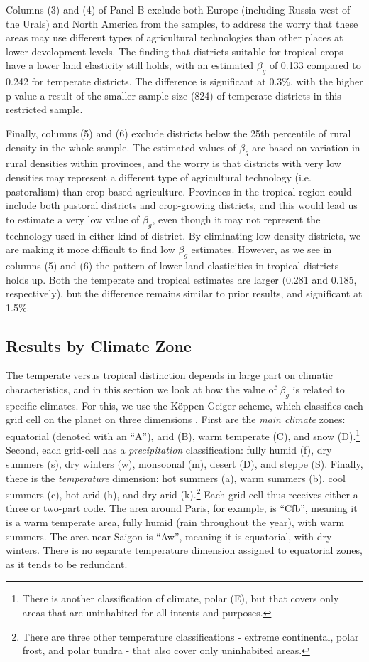 \documentclass[11pt]{article}
\begin{document}
Columns (3) and (4) of Panel B exclude both Europe (including Russia west of the Urals) and North America from the samples, to address the worry that these areas may use different types of agricultural technologies than other places at lower development levels. The finding that districts suitable for tropical crops have a lower land elasticity still holds, with an estimated $\beta_g$ of 0.133 compared to 0.242 for temperate districts. The difference is significant at 0.3\%, with the higher p-value a result of the smaller sample size (824) of temperate districts in this restricted sample.

Finally, columns (5) and (6) exclude districts below the 25th percentile of rural density in the whole sample. The estimated values of $\beta_g$ are based on variation in rural densities within provinces, and the worry is that districts with very low densities may represent a different type of agricultural technology (i.e. pastoralism) than crop-based agriculture. Provinces in the tropical region could include both pastoral districts and crop-growing districts, and this would lead us to estimate a very low value of $\beta_g$, even though it may not represent the technology used in either kind of district. By eliminating low-density districts, we are making it more difficult to find low $\beta_g$ estimates. However, as we see in columns (5) and (6) the pattern of lower land elasticities in tropical districts holds up. Both the temperate and tropical estimates are larger (0.281 and 0.185, respectively), but the difference remains similar to prior results, and significant at 1.5\%.

\subsection{Results by Climate Zone}
The temperate versus tropical distinction depends in large part on climatic characteristics, and in this section we look at how the value of $\beta_g$ is related to specific climates. For this, we use the K{\"o}ppen-Geiger scheme, which classifies each grid cell on the planet on three dimensions \citep{kottek2006}. First are the \textit{main climate} zones: equatorial (denoted with an ``A''), arid (B), warm temperate (C), and snow (D).\footnote{There is another classification of climate, polar (E), but that covers only areas that are uninhabited for all intents and purposes.} Second, each grid-cell has a \textit{precipitation} classification: fully humid (f), dry summers (s), dry winters (w), monsoonal (m), desert (D), and steppe (S). Finally, there is the \textit{temperature} dimension: hot summers (a), warm summers (b), cool summers (c), hot arid (h), and dry arid (k).\footnote{There are three other temperature classifications - extreme continental, polar frost, and polar tundra - that also cover only uninhabited areas.} Each grid cell thus receives either a three or two-part code. The area around Paris, for example, is ``Cfb'', meaning it is a warm temperate area, fully humid (rain throughout the year), with warm summers. The area near Saigon is ``Aw'', meaning it is equatorial, with dry winters. There is no separate temperature dimension assigned to equatorial zones, as it tends to be redundant.
\end{document}
